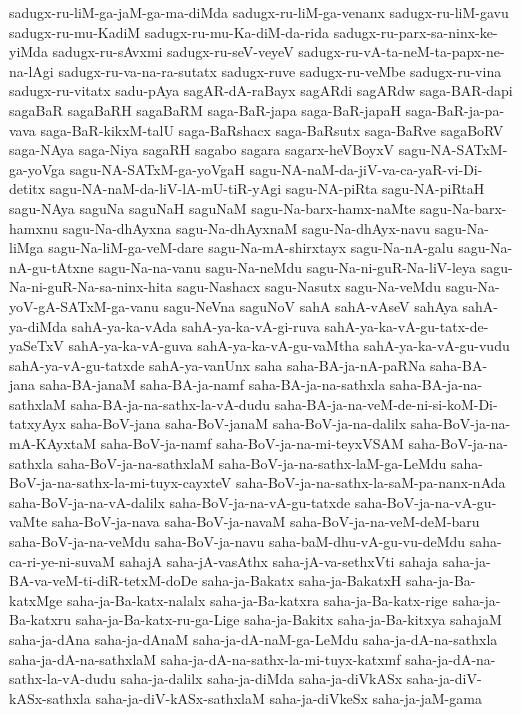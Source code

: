 {sadugx-ru-liM-ga-jaM-ga-ma-diMda
sadugx-ru-liM-ga-venanx
sadugx-ru-liM-gavu
sadugx-ru-mu-KadiM
sadugx-ru-mu-Ka-diM-da-rida
sadugx-ru-parx-sa-ninx-ke-yiMda
sadugx-ru-sAvxmi
sadugx-ru-seV-veyeV
sadugx-ru-vA-ta-neM-ta-papx-ne-na-lAgi
sadugx-ru-va-na-ra-sutatx
sadugx-ruve
sadugx-ru-veMbe
sadugx-ru-vina
sadugx-ru-vitatx
sadu-pAya
sagAR-dA-raBayx
sagARdi
sagARdw
saga-BAR-dapi
sagaBaR
sagaBaRH
sagaBaRM
saga-BaR-japa
saga-BaR-japaH
saga-BaR-ja-pa-vava
saga-BaR-kikxM-talU
saga-BaRshacx
saga-BaRsutx
saga-BaRve
sagaBoRV
saga-NAya
saga-Niya
sagaRH
sagabo
sagara
sagarx-heVBoyxV
sagu-NA-SATxM-ga-yoVga
sagu-NA-SATxM-ga-yoVgaH
sagu-NA-naM-da-jiV-va-ca-yaR-vi-Di-detitx
sagu-NA-naM-da-liV-lA-mU-tiR-yAgi
sagu-NA-piRta
sagu-NA-piRtaH
sagu-NAya
saguNa
saguNaH
saguNaM
sagu-Na-barx-hamx-naMte
sagu-Na-barx-hamxnu
sagu-Na-dhAyxna
sagu-Na-dhAyxnaM
sagu-Na-dhAyx-navu
sagu-Na-liMga
sagu-Na-liM-ga-veM-dare
sagu-Na-mA-shirxtayx
sagu-Na-nA-galu
sagu-Na-nA-gu-tAtxne
sagu-Na-na-vanu
sagu-Na-neMdu
sagu-Na-ni-guR-Na-liV-leya
sagu-Na-ni-guR-Na-sa-ninx-hita
sagu-Nashacx
sagu-Nasutx
sagu-Na-veMdu
sagu-Na-yoV-gA-SATxM-ga-vanu
sagu-NeVna
saguNoV
sahA
sahA-vAseV
sahAya
sahA-ya-diMda
sahA-ya-ka-vAda
sahA-ya-ka-vA-gi-ruva
sahA-ya-ka-vA-gu-tatx-de-yaSeTxV
sahA-ya-ka-vA-guva
sahA-ya-ka-vA-gu-vaMtha
sahA-ya-ka-vA-gu-vudu
sahA-ya-vA-gu-tatxde
sahA-ya-vanUnx
saha
saha-BA-ja-nA-paRNa
saha-BA-jana
saha-BA-janaM
saha-BA-ja-namf
saha-BA-ja-na-sathxla
saha-BA-ja-na-sathxlaM
saha-BA-ja-na-sathx-la-vA-dudu
saha-BA-ja-na-veM-de-ni-si-koM-Di-tatxyAyx
saha-BoV-jana
saha-BoV-janaM
saha-BoV-ja-na-dalilx
saha-BoV-ja-na-mA-KAyxtaM
saha-BoV-ja-namf
saha-BoV-ja-na-mi-teyxVSAM
saha-BoV-ja-na-sathxla
saha-BoV-ja-na-sathxlaM
saha-BoV-ja-na-sathx-laM-ga-LeMdu
saha-BoV-ja-na-sathx-la-mi-tuyx-cayxteV
saha-BoV-ja-na-sathx-la-saM-pa-nanx-nAda
saha-BoV-ja-na-vA-dalilx
saha-BoV-ja-na-vA-gu-tatxde
saha-BoV-ja-na-vA-gu-vaMte
saha-BoV-ja-nava
saha-BoV-ja-navaM
saha-BoV-ja-na-veM-deM-baru
saha-BoV-ja-na-veMdu
saha-BoV-ja-navu
saha-baM-dhu-vA-gu-vu-deMdu
saha-ca-ri-ye-ni-suvaM
sahajA
saha-jA-vasAthx
saha-jA-va-sethxVti
sahaja
saha-ja-BA-va-veM-ti-diR-tetxM-doDe
saha-ja-Bakatx
saha-ja-BakatxH
saha-ja-Ba-katxMge
saha-ja-Ba-katx-nalalx
saha-ja-Ba-katxra
saha-ja-Ba-katx-rige
saha-ja-Ba-katxru
saha-ja-Ba-katx-ru-ga-Lige
saha-ja-Bakitx
saha-ja-Ba-kitxya
sahajaM
saha-ja-dAna
saha-ja-dAnaM
saha-ja-dA-naM-ga-LeMdu
saha-ja-dA-na-sathxla
saha-ja-dA-na-sathxlaM
saha-ja-dA-na-sathx-la-mi-tuyx-katxmf
saha-ja-dA-na-sathx-la-vA-dudu
saha-ja-dalilx
saha-ja-diMda
saha-ja-diVkASx
saha-ja-diV-kASx-sathxla
saha-ja-diV-kASx-sathxlaM
saha-ja-diVkeSx
saha-ja-jaM-gama
}
